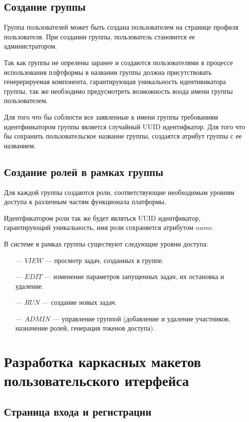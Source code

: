 \subsection{Создание группы}

Группа пользователей может быть создана пользователем на странице профиля пользователя. При создании группы, пользователь становится ее администратором.

Так как группы не опрелены заранее и создаются пользователями в процессе использования плфтформы в названии группы должна присутствовать генерерируемая компонента, гарантирующая уникальность идентивикатора группы, так же необзодимо предусмотреть возможность воода имени группы пользователем.

Для того что бы соблюсти все заявленные к имени группы требованиям идентфиикатором группы является случайный UUID идентифкатор. Для того что бы сохранить пользовательское название группы, создаятся атрибут группы с ее названием.

\subsection{Создание ролей в рамках группы}

Для каждой группы создаются роли, соответствующие необходимым уровням доступа к различным частям функционала платформы.

Идентфикатором роли так же будет являться UUID идентфикатор, гарантирующий уникальность, имя роли сохраняется атрибутом $name$.

В системе в рамках группы существуют следующие уровни доступа:

\begin{itemize}
  \item[---]$VIEW$ --– просмотр задач, созданных в группе.
  \item[---]$EDIT$ –-- изменение параметров запущенных задач, их остановка и удаление.
  \item[---]$RUN$ –-- создание новых задач.
  \item[---]$ADMIN$ –-- управление группой (добавление и удаление участников, назначение ролей, генерация токенов доступа).
\end{itemize}

\section{Разработка каркасных макетов пользовательского итерфейса}

\subsection{Страница входа и регистрации}

